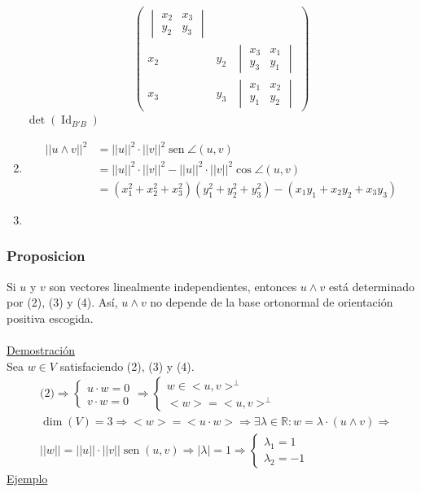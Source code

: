 \documentclass[12pt, a4paper, ones, notitlepage, openany,titlepage]{article}
\newcommand{\demostracion}{\noindent\underline{Demostración}}
\begin{document}
\begin{enumerate}
$$\begin{pmatrix}
\begin{vmatrix}
			x_2 & x_3 \\
			y_2 & y_3
		\end{vmatrix} \\
		x_2 & y_2 & \begin{vmatrix}
			x_3 & x_1 \\
			y_3 & y_1
		\end{vmatrix}\\
		x_3 & y_3 & \begin{vmatrix}
			x_1 & x_2 \\
			y_1 & y_2
		\end{vmatrix}
	\end{pmatrix}
	$$
	$\operatorname{det}(\operatorname{Id}_{B'B})$
	\item
	\begin{align*}
		||u \wedge v||^2 & = ||u||^2 \cdot ||v||^2 \operatorname{sen} 	\angle (u,v) \\
		& = ||u||^2 \cdot ||v||^2 - ||u||^2 \cdot ||v||^2 	\operatorname{cos} \angle (u,v) \\
		& = (x^2_1 + x^2_2 + x^2_3)(y^2_1 + y^2_2 + y^2_3) - 
		(x_1 y_1 + x_2 y_2 + x_3 y_3)
	\end{align*}
	\item 
\end{enumerate}

\subsubsection{Proposicion}
Si $u$ y $v$ son vectores linealmente independientes, entonces $u \wedge v$ está determinado por (2), (3) y (4). Así, $u \wedge v$ no depende de la base ortonormal de orientación positiva escogida.\\\\
\demostracion\\
Sea $w \in V$ satisfaciendo (2), (3) y (4).
\begin{align*}
	& \text{(2)} \Longrightarrow  
	\begin{cases}
		u \cdot w = 0 \\
		v \cdot w = 0
	\end{cases}
	\Longrightarrow
	\begin{cases}
		w \in <u,v>^\bot \\
		<w> = <u,v>^\bot
	\end{cases}\\
	& \operatorname{dim}(V) = 3 \Longrightarrow <w> = <u \cdot w> \Longrightarrow \exists \lambda \in \mathbb{R} : w = \lambda \cdot (u \wedge v)
	\Longrightarrow \\
	& ||w|| = ||u|| \cdot ||v|| \operatorname{sen}(u,v) \Longrightarrow |\lambda| = 1 \Longrightarrow \begin{cases}
		\lambda_1 = 1 \\
		\lambda_2 = -1
	\end{cases}
\end{align*}
\underline{Ejemplo}\\
\end{document}
